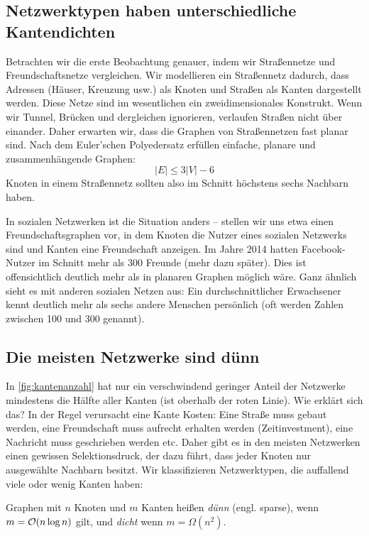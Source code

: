 \subsection{Netzwerktypen haben unterschiedliche Kantendichten}
Betrachten wir die erste Beobachtung genauer, indem wir Straßennetze und Freundschaftsnetze vergleichen.
Wir modellieren ein Straßennetz dadurch, dass Adressen (Häuser, Kreuzung usw.) als Knoten und Straßen als Kanten dargestellt werden.
Diese Netze  sind im wesentlichen ein zweidimensionales Konstrukt.
Wenn wir Tunnel, Brücken und dergleichen ignorieren, verlaufen Straßen nicht über einander.
Daher erwarten wir, dass die Graphen von Straßennetzen fast planar sind.
Nach dem Euler'schen Polyedersatz erfüllen einfache,  planare und zusammenhängende Graphen:
\begin{equation}
    |E| \le 3 |V| - 6
\end{equation}
Knoten in einem Straßennetz sollten also im Schnitt höchstens sechs Nachbarn haben.

In  sozialen Netzwerken ist die Situation anders --
stellen wir uns etwa einen Freundschaftsgraphen vor, in dem Knoten die Nutzer eines sozialen Netzwerks sind und Kanten eine Freundschaft anzeigen.
Im Jahre 2014 hatten Facebook-Nutzer im Schnitt mehr als 300 Freunde (mehr dazu später).
Dies ist offensichtlich deutlich mehr als in planaren Graphen möglich wäre.
Ganz ähnlich sieht es mit anderen sozialen Netzen aus: Ein durchschnittlicher Erwachsener kennt deutlich mehr als sechs andere Menschen persönlich (oft werden Zahlen zwischen 100 und 300 genannt).

\subsection{Die meisten Netzwerke sind dünn}
In \cref{fig:kantenanzahl} hat nur ein verschwindend geringer Anteil der Netzwerke mindestens die Hälfte aller Kanten (\dh ist oberhalb der roten Linie).
Wie erklärt sich das?
In der Regel verursacht eine Kante Kosten:
Eine Straße muss gebaut werden, eine Freundschaft muss aufrecht erhalten werden (Zeitinvestment), eine Nachricht muss geschrieben werden etc.
Daher gibt es in den meisten Netzwerken einen gewissen Selektionsdruck, der dazu führt, dass jeder Knoten nur ausgewählte Nachbarn besitzt.
Wir klassifizieren Netzwerktypen, die auffallend viele oder wenig Kanten haben:

\begin{definition}
    Graphen  mit $n$ Knoten und $m$ Kanten heißen \emph{dünn} (engl. sparse), wenn $m = \mathcal{O}\!\left(n \log n\right)$ gilt, und \emph{dicht} wenn $m = \Omega(n^2)$.
\end{definition}

